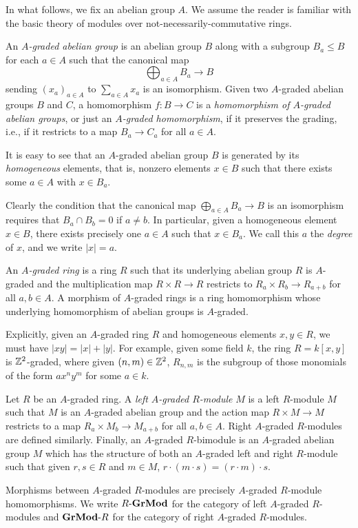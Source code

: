 \documentclass[../main.tex]{subfiles}
\begin{document}
In what follows, we fix an abelian group $A$. We assume the reader is familiar with the basic theory of modules over not-necessarily-commutative rings.

\begin{definition}\label{graded_abgrp}
	An \emph{$A$-graded abelian group} is an abelian group $B$ along with a subgroup $B_a\leq B$ for each $a\in A$ such that the canonical map
	\[\bigoplus_{a\in A}B_a\to B\]
	sending $(x_a)_{a\in A}$ to $\sum_{a\in A}x_a$ is an isomorphism. Given two $A$-graded abelian groups $B$ and $C$, a homomorphism $f:B\to C$ is a \textit{homomorphism of $A$-graded abelian groups}, or just an \emph{$A$-graded homomorphism}, if it preserves the grading, i.e., if it restricts to a map $B_a\to C_a$ for all $a\in A$. 
\end{definition}

It is easy to see that an $A$-graded abelian group $B$ is generated by its \emph{homogeneous} elements, that is, nonzero elements $x\in B$ such that there exists some $a\in A$ with $x\in B_a$.

\begin{remark}
	Clearly the condition that the canonical map $\bigoplus_{a\in A}B_a\to B$ is an isomorphism requires that $B_a\cap B_b=0$ if $a\neq b$. In particular, given a homogeneous element $x\in B$, there exists precisely one $a\in A$ such that $x\in B_a$. We call this $a$ the \emph{degree} of $x$, and we write $|x|=a$.
\end{remark}

\begin{definition}
	An \emph{$A$-graded ring} is a ring $R$ such that its underlying abelian group $R$ is $A$-graded and the multiplication map $R\times R\to R$ restricts to $R_a\times R_b\to R_{a+b}$ for all $a,b\in A$. A morphism of $A$-graded rings is a ring homomorphism whose underlying homomorphism of abelian groups is $A$-graded.
\end{definition}

Explicitly, given an $A$-graded ring $R$ and homogeneous elements $x,y\in R$, we must have $|xy|=|x|+|y|$. For example, given some field $k$, the ring $R=k[x,y]$ is $\mathbb{Z}^2$-graded, where given $(n,m)\in\mathbb{Z}^2$, $R_{n,m}$ is the subgroup of those monomials of the form $ax^ny^m$ for some $a\in k$. 

\begin{definition}
	Let $R$ be an $A$-graded ring. A \emph{left $A$-graded $R$-module} $M$ is a left $R$-module $M$ such that $M$ is an $A$-graded abelian group and the action map $R\times M\to M$ restricts to a map $R_a\times M_b\to M_{a+b}$ for all $a,b\in A$. Right $A$-graded $R$-modules are defined similarly. Finally, an $A$-graded $R$-bimodule is an $A$-graded abelian group $M$ which has the structure of both an $A$-graded left and right $R$-module such that given $r,s\in R$ and $m\in M$, $r\cdot(m\cdot s)=(r\cdot m)\cdot s$. 
	
	Morphisms between $A$-graded $R$-modules are precisely $A$-graded $R$-module homomorphisms. We write $R\text-\mathbf{GrMod}$ for the category of left $A$-graded $R$-modules and $\mathbf{GrMod}\text-R$ for the category of right $A$-graded $R$-modules.
\end{definition}
\end{document}
